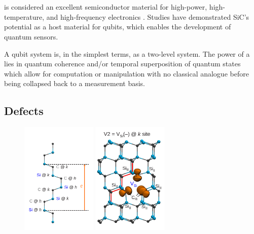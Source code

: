 \section{}\label{SiC}

 is considered an excellent semiconductor material for high-power, high-temperature, and high-frequency electronics \cite{Eddy2009,CASADY19961409}. Studies have demonstrated SiC's potential as a host material for qubits, which enables the development of quantum sensors. 



A qubit system is, in the simplest terms, as a two-level system. The power of a  lies in quantum coherence and/or
temporal superposition of quantum states which allow for computation or manipulation with no classical analogue before being collapsed back to a measurement basis. 



\subsection{Defects}

\begin{figure}[H]
    \begin{center}
        \includegraphics[width=0.32\textwidth]{figures/SiC-non-equiv-sites.pdf}
        \hspace{1em}
        \includegraphics[width=0.32\textwidth]{figures/SiC-V2.pdf}
    \end{center}
    \caption{}\label{fig:}
\end{figure}


